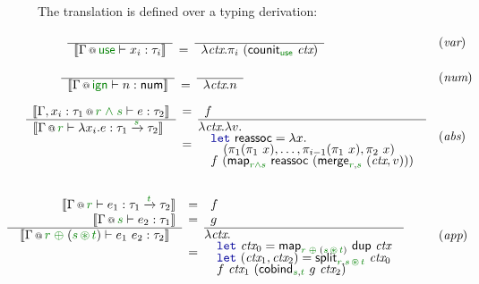 \begin{figure*}[t]

The translation is defined over a typing derivation:
%
\begin{equation*}
\hspace{-3em}
\begin{array}{ll}
\hspace{4.8em}\semdef
  {\coctx{\Gamma}{\cunit} \vdash x_i : \tau_i }
  {\lambda\ctx.\pi_i~(\ident{counit}_{\cunit}~\ctx)}
& (\emph{var})
\\[1em]
\hspace{4.3em}\semdef
  {\coctx{\Gamma}{\czero} \vdash n : \ident{num} }
  {\lambda\ctx.n}
& (\emph{num})
\\[1.5em]
\hspace{1.5em}\emdeff
  {\coctx{\Gamma, x_i:\tau_1}{\cclrd{r}\;\czip\;\cclrd{s}} \vdash e : \tau_2}
  {\hspace{-1em}\begin{array}{l}
    \sem{\coctx{\Gamma}{\cclrd{r}} \vdash \lambda x_i.e : \tau_1 \xrightarrow{\cclrd{s}} \tau_2}
    \\[-0.3em]~\\[-0.3em]~ \\[-0.3em]~
  \end{array} }
  {f}
  {\hspace{-1em}\begin{array}{l}
    \lambda \ctx.\lambda v.\\[-0.3em]
    \quad \kvd{let}~\ident{reassoc} = \lambda x.\\[-0.3em]
    \quad\quad (\pi_1(\pi_1~x), \ldots, \pi_{i-1}(\pi_1~x), \pi_2~x)\\[-0.3em]
    \quad f~(\ident{map}_{\cclrd{r}\czip\cclrd{s}}~\ident{reassoc}~(\ident{merge}_{\cclrd{r}, \cclrd{s}}~(\ctx, v)))
   \end{array} }
& (\emph{abs})
\\[4em]
\emdefff
  {\coctx{\Gamma}{\cclrd{r}} \vdash e_1 : \tau_1 \xrightarrow{\cclrd{t}} \tau_2}
  {\coctx{\Gamma}{\cclrd{s}} \vdash e_2 : \tau_1 }
  {\begin{array}{r}\sem{\coctx{\Gamma}{\cclrd{r} \;\cpar\; (\cclrd{s} \,\cseq\, \cclrd{t})} \vdash e_1~e_2 : \tau_2}\\[-0.3em]~\\[-0.3em]~\\[-0.3em]~\end{array}}
  {f}
  {g}
  {\hspace{-1em}\begin{array}{l}
  \lambda\ctx.~~\\[-0.3em]
    \quad \kvd{let}~\ctx_0 = \ident{map}_{\cclrd{r} \;\cpar\; (\cclrd{s} \,\cseq\, \cclrd{t})}~\ident{dup}~\ctx\\[-0.3em]
    \quad \kvd{let}~(\ctx_1, \ctx_2) = \ident{split}_{\cclrd{r}, \cclrd{s} \,\cseq\, \cclrd{t}}~\ctx_0\\[-0.3em]
    \quad f~\ctx_1~
      (\ident{cobind}_{\cclrd{s}, \cclrd{t}}~g~\ctx_2)
  \end{array} }
& (\emph{app})
\end{array}
\end{equation*}


\end{figure*}
